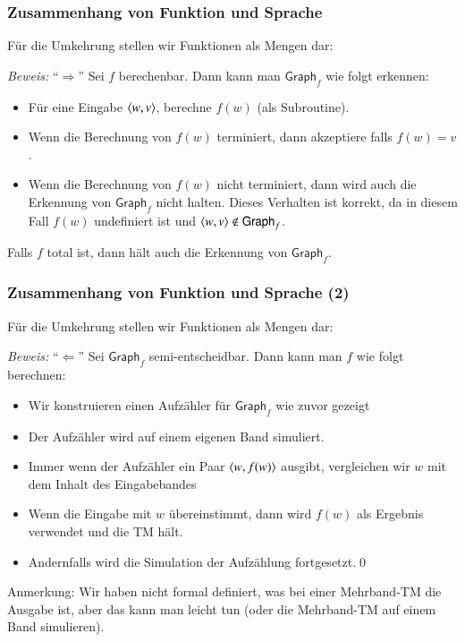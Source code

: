 \documentclass[onlymath]{beamer}
\begin{document}
\begin{frame}[t]\frametitle{Zusammenhang von Funktion und Sprache}

Für die Umkehrung stellen wir Funktionen als Mengen dar:


\pause
\emph{Beweis:} "`$\Rightarrow$"' Sei $f$ berechenbar. Dann kann man $\textsf{Graph}_f$ wie folgt
erkennen:
\begin{itemize}
\item Für eine Eingabe $\langle{w,v}\rangle$, berechne $f(w)$ (als Subroutine).
\item Wenn die Berechnung von $f(w)$ terminiert, dann akzeptiere falls $f(w)=v$.
\item Wenn die Berechnung von $f(w)$ nicht terminiert, dann wird auch die Erkennung von $\textsf{Graph}_f$ nicht halten. Dieses Verhalten ist korrekt, da in diesem Fall $f(w)$ undefiniert ist und
$\langle{w,v}\rangle\notin\textsf{Graph}_f$.
\end{itemize}\pause
Falls $f$ total ist, dann hält auch die Erkennung von $\textsf{Graph}_f$.

\end{frame}

\begin{frame}[t]\frametitle{Zusammenhang von Funktion und Sprache (2)}

Für die Umkehrung stellen wir Funktionen als Mengen dar:

\pause

\emph{Beweis:} "`$\Leftarrow$"' Sei $\textsf{Graph}_f$ semi-entscheidbar. Dann kann
man $f$ wie folgt berechnen:
\begin{itemize}
\item Wir konstruieren einen Aufzähler für $\textsf{Graph}_f$ wie zuvor gezeigt
\item Der Aufzähler wird auf einem eigenen Band simuliert.
\item Immer wenn der Aufzähler ein Paar $\langle{w,f(w)}\rangle$ ausgibt, vergleichen wir
	$w$ mit dem Inhalt des Eingabebandes
\item Wenn die Eingabe mit $w$ übereinstimmt, dann wird $f(w)$ als Ergebnis verwendet und die TM hält.
\item Andernfalls wird die Simulation der Aufzählung fortgesetzt.\qed
\end{itemize}

{\tiny
Anmerkung: Wir haben nicht formal definiert, was bei einer Mehrband-TM die Ausgabe ist, aber
das kann man leicht tun (oder die Mehrband-TM auf einem Band simulieren).

}
\end{frame}
\end{document}
